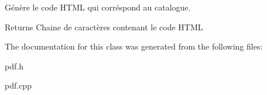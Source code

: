 Génère le code H\-T\-M\-L qui corréspond au catalogue. 

\begin{DoxyReturn}{Returns}
Chaine de caractères contenant le code H\-T\-M\-L 
\end{DoxyReturn}


The documentation for this class was generated from the following files\-:\begin{DoxyCompactItemize}
\item 
pdf.\-h\item 
pdf.\-cpp\end{DoxyCompactItemize}
